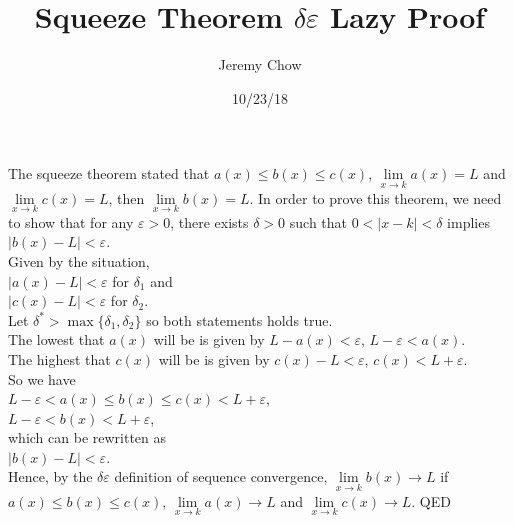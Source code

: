\documentclass[12pt]{article}
\title{Squeeze Theorem $\delta\varepsilon$ Lazy Proof}
\author{Jeremy Chow}
\date{10/23/18}
\begin{document}
\maketitle
The squeeze theorem stated that $a(x)\leq b(x) \leq c(x)$, $\lim\limits_{x \to k}a(x)=L  $ and $\lim\limits_{x \to k}c(x)=L $, then $\lim\limits_{x \to k}b(x)=L $. In order to prove this theorem, we need to show that for any $\varepsilon>0$, there exists $\delta>0$ such that $0<|x-k|<\delta$ implies $|b(x)-L|<\varepsilon$. \\Given by the situation,\\ $|a(x)-L|<\varepsilon$ for $\delta_{1}$ and\\ $|c(x)-L|<\varepsilon$ for $\delta_{2}$.\\ Let $\delta^*>\max\{\delta_{1},\delta_{2}\}$ so both statements holds true.\\ The lowest that $a(x)$ will be is given by $L-a(x)<\varepsilon$, $L-\varepsilon<a(x)$.\\ The highest that $c(x)$ will be is given by $c(x)-L<\varepsilon$, $c(x)<L+\varepsilon$.\\ So we have\\ $L-\varepsilon<a(x)\leq b(x) \leq c(x)<L+\varepsilon$,\\ $L-\varepsilon<b(x)<L+\varepsilon$,\\ which can be rewritten as\\ $|b(x)-L|<\varepsilon$.\\ Hence, by the $\delta\varepsilon$ definition of sequence convergence, $\lim\limits_{x \to k}b(x)\to L$ if $a(x)\leq b(x) \leq c(x)$, $\lim\limits_{x \to k}a(x)\to L  $ and $\lim\limits_{x \to k}c(x)\to L$. QED
\end{document}
